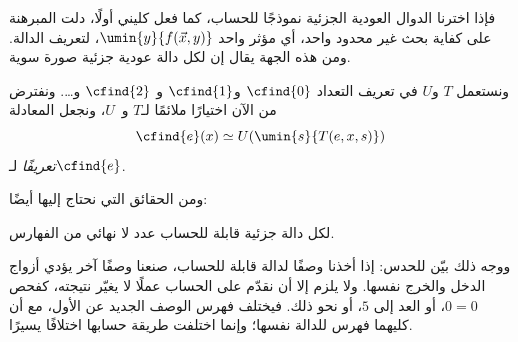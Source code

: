 \documentclass[../../../include/open-logic-section]{subfiles}
\begin{document}
فإذا اخترنا الدوال العودية الجزئية نموذجًا للحساب، كما فعل كليني
أولًا، دلت المبرهنة على كفاية بحث غير محدود واحد،
أي مؤثر واحد $\umin{y}{f(\vec x,y)}$، لتعريف الدالة. ومن هذه
الجهة يقال إن لكل دالة عودية جزئية صورة سوية.

ونستعمل $T$ و$U$ في تعريف التعداد $\cfind{0}$ و$\cfind{1}$ و
$\cfind{2}$ و…. ونفترض من الآن اختيارًا ملائمًا
لـ$T$ و~$U$، ونجعل المعادلة
\[
\cfind{e}(x) \simeq U(\umin{s}{T(e,x,s)})
\]
\emph{تعريفًا} لـ$\cfind{e}$.

ومن الحقائق التي نحتاج إليها أيضًا:

\begin{thm}
لكل دالة جزئية قابلة للحساب عدد لا نهائي من الفهارس.
\end{thm}

ووجه ذلك بيّن للحدس: إذا أخذنا وصفًا لدالة قابلة للحساب، صنعنا
وصفًا آخر يؤدي أزواج الدخل والخرج نفسها. ولا يلزم إلا أن
نقدّم على الحساب عملًا لا يغيّر نتيجته، كفحص
$0=0$، أو العد إلى $5$، أو نحو ذلك. فيختلف فهرس الوصف الجديد
عن الأول، مع أن كليهما فهرس للدالة نفسها؛ وإنما اختلفت طريقة
حسابها اختلافًا يسيرًا.
\end{document}
